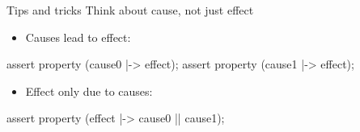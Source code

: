 \documentclass{beamer}
\begin{document}
\begin{frame}[fragile]{Tips and tricks}
Think about cause, not just effect

\pause
\begin{itemize}
 \item Causes lead to effect:
\end{itemize}

\begin{semiverbatim}
assert property (cause0 |-> effect);
assert property (cause1 |-> effect);
\end{semiverbatim}

\pause
\begin{itemize}
 \item Effect only due to causes:
\end{itemize}

\begin{semiverbatim}
assert property (effect |-> cause0 || cause1);
\end{semiverbatim}

\end{frame}
\end{document}
